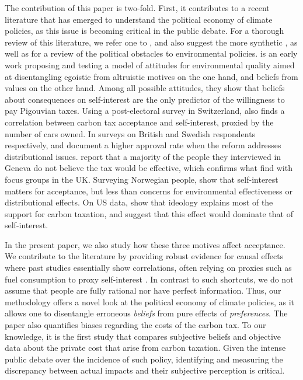 \documentclass[11pt]{article}
\begin{document}
The contribution of this paper is two-fold. First, it contributes to a recent literature that has emerged to understand the political economy of climate policies, as this issue is becoming critical in the public debate. For a thorough review of this literature, we refer one to  \citet{carattini_overcoming_2018}, and also suggest the more synthetic \citet{klenert_making_2018}, as well as \citet{millner_beliefs_2016} for a review of the political obstacles to environmental policies. \citet{stern_value_1993} is an early work proposing and testing a model of attitudes for environmental quality aimed at disentangling egoistic from altruistic motives on the one hand, and beliefs from values on the other hand. Among all possible attitudes, they show that beliefs about consequences on self-interest are the only predictor of the willingness to pay Pigouvian taxes. Using a post-electoral survey in Switzerland, \citet{thalmann_public_2004} also finds a correlation between carbon tax acceptance and self-interest, proxied by the number of cars owned. In surveys on British and Swedish respondents respectively, \citet{bristow_public_2010} and \citet{brannlund_tax_2012} document a higher approval rate when the reform addresses distributional issues. \citet{baranzini_effectiveness_2017} report that a majority of the people they interviewed in Geneva do not believe the tax would be effective, which confirms what \citet{dresner_history_2006} find with focus groups in the UK. Surveying Norwegian people, \citet{kallbekken_saelen_2011} show that self-interest matters for acceptance, but less than concerns for environmental effectiveness or distributional effects. On US data, \citet{anderson_can_2019} show that ideology explains most of the support for carbon taxation, and suggest that this effect would dominate that of self-interest.

In the present paper, we also study how these three motives affect acceptance. We contribute to the literature by providing robust evidence for causal effects where past studies essentially show correlations, often relying on proxies such as fuel consumption to proxy self-interest \citep[e.g.][]{thalmann_public_2004,kallbekken_saelen_2011,anderson_can_2019}. In contrast to such shortcuts, we do not assume that people are fully rational nor have perfect information. Thus, our methodology offers a novel look at the political economy of climate policies, as it allows one to disentangle erroneous \emph{beliefs} from pure effects of \emph{preferences}. The paper also quantifies biases regarding the costs of the carbon tax. To our knowledge, it is the first study that compares subjective beliefs and objective data about the private cost that arise from carbon taxation. Given the intense public debate over the incidence of such policy, identifying and measuring the discrepancy between actual impacts and their subjective perception is critical.%
\end{document}
